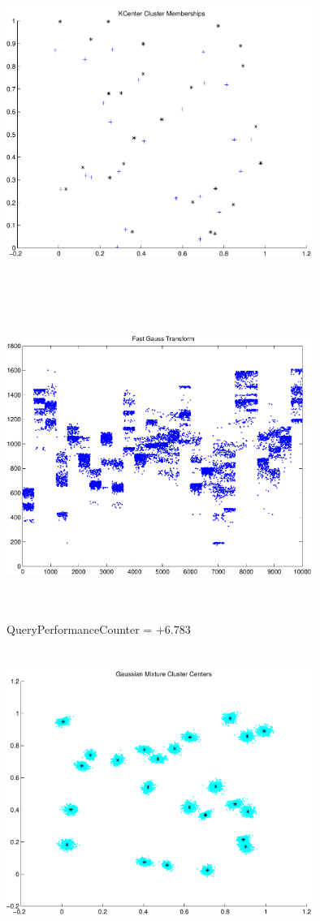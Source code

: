 \documentclass[9pt]{article}
\theoremstyle{plain}
\theoremstyle{definition}
\theoremstyle{remark}
\numberwithin{equation}{section}
\begin{document}
\includegraphics[width=10.0cm,height=10.0cm]{KCenterClusterMemberships_25_Centers.pdf}

\includegraphics[width=10.0cm,height=10.0cm]{FGT25_Centers.pdf}

QueryPerformanceCounter  =  +6.783
\includegraphics[width=10.0cm,height=10.0cm]{GaussianMixture_ClusterCenters24_Centers.pdf}
\end{document}
